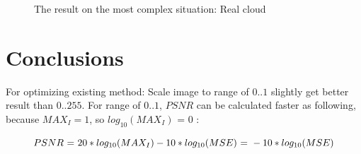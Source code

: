 \begin{figure}[h!]
	\centering
	\centering
	\caption{The result on the most complex situation: Real cloud}
\end{figure}

\section{Conclusions}

For optimizing existing method: Scale image to range of $0..1$ slightly get better result than $0..255$. For range of $0..1$, $PSNR$ can be calculated faster as following, because $MAX_I = 1$, so $log_{10}(MAX_I) \textrm{ = } 0$ :

\begin{equation}
\centering
PSNR \textrm{ = } 20 * log_{10}(MAX_I) - 10 * log_{10}(MSE) \textrm{ = } -10 * log_{10}(MSE)
\end{equation}

